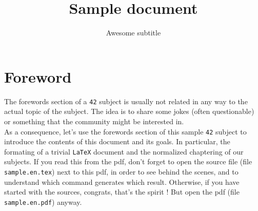 \documentclass{42-en}
\begin{document}
                           \title{Sample document}
                          \subtitle{Awesome subtitle}


\maketitle

\tableofcontents


\chapter{Foreword}

    The forewords section of a \texttt{42} subject is usually not
    related in any way to the actual topic of the subject. The idea is
    to share some jokes (often questionable) or something that the
    community might be interested in.\\










    As a consequence, let's use the forewords section of this sample
    \texttt{42} subject to introduce the contents of this document and
    its goals. In particular, the formating of a trivial
    \texttt{LaTeX} document and the normalized chaptering of our
    subjects. If you read this from the pdf, don't forget to open the
    source file (file \texttt{sample.en.tex}) next to this pdf, in
    order to see behind the scenes, and to understand which command
    generates which result. Otherwise, if you have started with the
    sources, congrats, that's the spirit ! But open the pdf (file
    \texttt{sample.en.pdf}) anyway.\\
\end{document}
